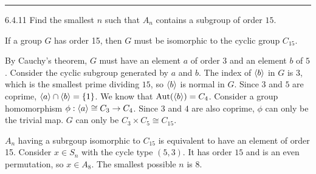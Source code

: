 \documentclass[a4paper, 12pt]{article}
\begin{document}
\noindent\rule{7in}{2.8pt}
\begin{problem}{6.4.11}
Find the smallest \(n\) such that \(A_n\) contains a subgroup of order \(15\).
\end{problem}
\begin{solution}
\begin{claim}
If a group \(G\) has order 15, then \(G\) must be isomorphic to the cyclic group \(C_{15}\).
\end{claim}
\begin{claimproof}
By Cauchy's theorem, \(G\) must have an element \(a\) of order \(3\) and an element \(b\) of \(5\). Consider the cyclic subgroup generated by \(a\) and \(b\). 
The index of \(\langle b\rangle\) in \(G\) is \(3\), which is the smallest prime dividing \(15\), so \(\langle b\rangle\) is normal in \(G\). 
Since \(3\) and \(5\) are coprime, 
\(\langle a\rangle \cap \langle b\rangle =\left\{ 1 \right\}\). We know that \(\text{Aut}(\langle b\rangle)=C_4\). Consider a group homomorphism \(\phi:\langle a\rangle\cong C_3 \rightarrow C_4\). Since \(3\) and \(4\) are also coprime, 
\(\phi\) can only be the trivial map. \(G\) can only be \(C_3\times C_5\cong C_{15}\).
\end{claimproof}

\(A_n\) having a subrgoup isomorphic to \(C_{15}\) is equivalent to have an element of order 15. Consider \(x\in S_n\) with the cycle type \((5,3)\). It has order \(15\) and is an even permutation, so \(x\in A_8\). The smallest 
possible \(n\) is 8.
\end{solution}
\end{document}
